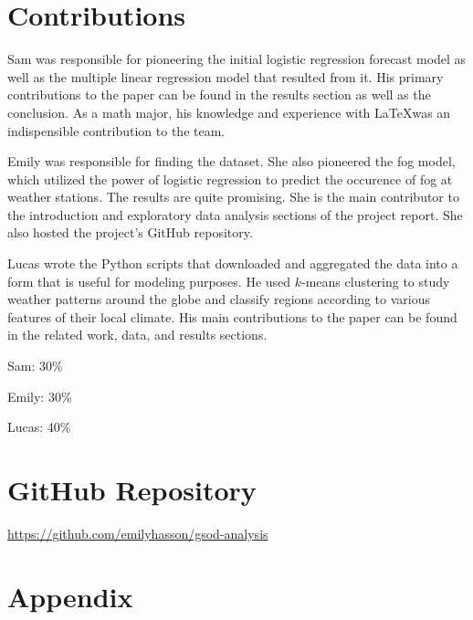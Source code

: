 \documentclass[conference]{IEEEtran}
\begin{document}
\section{Contributions}

Sam was responsible for pioneering the initial logistic regression forecast model as well as the multiple linear regression model that resulted from it. His primary contributions to the paper can be found in the results section as well as the conclusion. As a math major, his knowledge and experience with \LaTeX was an indispensible contribution to the team.

Emily was responsible for finding the dataset. She also pioneered the fog model, which utilized the power of logistic regression to predict the occurence of fog at weather stations. The results are quite promising. She is the main contributor to the introduction and exploratory data analysis sections of the project report. She also hosted the project's GitHub repository.

Lucas wrote the Python scripts that downloaded and aggregated the data into a form that is useful for modeling purposes. He used $k$-means clustering to study weather patterns around the globe and classify regions according to various features of their local climate. His main contributions to the paper can be found in the related work, data, and results sections.

Sam: 30\%

Emily: 30\%

Lucas: 40\%

\section{GitHub Repository}

\href{https://github.com/emilyhasson/gsod-analysis}{https://github.com/emilyhasson/gsod-analysis}

\section{Appendix}
\end{document}
